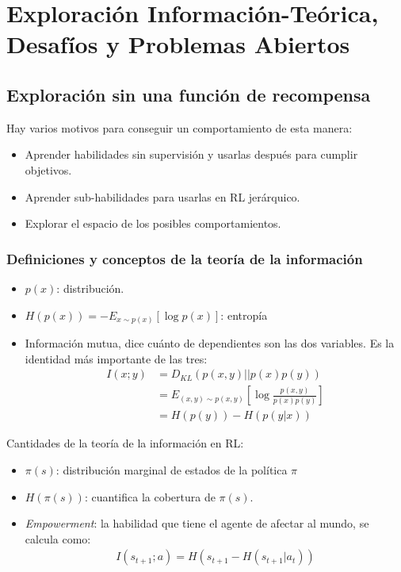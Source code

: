 \chapter{Exploración Información-Teórica, Desafíos y Problemas Abiertos}%
\label{cha:exploración_información_teórica_desafíos_y_problemas_abiertos}


\section{Exploración sin una función de recompensa}%
\label{sec:exploración_sin_una_función_de_recompensa}

Hay varios motivos para conseguir un comportamiento de esta manera:
\begin{itemize}
    \item Aprender habilidades sin supervisión y usarlas después para cumplir objetivos.
    \item Aprender sub-habilidades para usarlas en RL jerárquico.
    \item Explorar el espacio de los posibles comportamientos.
\end{itemize}

\subsection{Definiciones y conceptos de la teoría de la información}%
\label{sub:definiciones_y_conceptos_de_la_teoría_de_la_información}

\begin{itemize}
    \item $p(x)$: distribución.
    \item $H(p(x))=-E_{x\sim p(x)}[\log p(x)]$: entropía
    \item Información mutua, dice cuánto de dependientes son las dos variables. Es la
        identidad más importante de las tres:
        \begin{align}
            I(x;y)&=D_{KL}(p(x,y)||p(x)p(y))\\
                  &= E_{(x,y)\sim p(x,y)}\left[\log \frac{p(x,y)}{p(x)p(y)}  \right]\\
                  &= H(p(y)) - H(p(y|x))
        \end{align}
\end{itemize}

Cantidades de la teoría de la información en RL:
\begin{itemize}
    \item $\pi(s)$: distribución marginal de estados de la política $\pi$ 
    \item $H(\pi(s))$: cuantifica la cobertura de  $\pi(s)$.
    \item \textit{Empowerment}: la habilidad que tiene el agente de afectar al mundo, se calcula
        como:
        \begin{align}
            I(s_{t+1};a)=H(s_{t+1}-H(s_{t+1}|a_t))
        \end{align}
\end{itemize}

